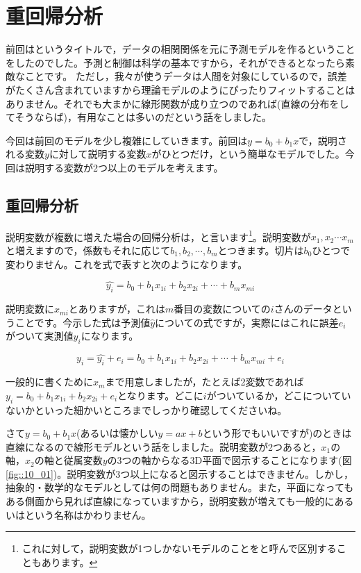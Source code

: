 \documentclass{ltjbook}
\begin{document}
\chapter{重回帰分析}
\label{m10_MultipleRegression}

前回はというタイトルで，データの相関関係を元に予測モデルを作るということをしたのでした。予測と制御は科学の基本ですから，それができるとなったら素敵なことです。
ただし，我々が使うデータは人間を対象にしているので，誤差がたくさん含まれていますから理論モデルのようにぴったりフィットすることはありません。それでも大まかに線形関数が成り立つのであれば(直線の分布をしてそうならば)，有用なことは多いのだという話をしました。

今回は前回のモデルを少し複雑にしていきます。前回は$y=b_0+b_1x$で，説明される変数$y$に対して説明する変数$x$がひとつだけ，という簡単なモデルでした。今回は説明する変数が2つ以上のモデルを考えます。

\section{重回帰分析}
説明変数が複数に増えた場合の回帰分析は，と言います\footnote{これに対して，説明変数が1つしかないモデルのことをと呼んで区別することもあります。}。説明変数が$x_1,x_2\cdots x_m$と増えますので，係数もそれに応じて$b_1,b_2,\cdots,b_m$とつきます。切片は$b_0$ひとつで変わりません。これを式で表すと次のようになります。

\[\hat{y_i}=b_0 + b_1x_{1i}+b_2x_{2i}+\cdots+b_mx_{mi}\]

説明変数に$x_{mi}$とありますが，これは$m$番目の変数についての$i$さんのデータということです。今示した式は予測値$\hat{y}$についての式ですが，実際にはこれに誤差$e_i$がついて実測値$y_i$になります。

\[ y_i = \hat{y_i} + e_i = b_0 + b_1x_{1i}+b_2x_{2i}+\cdots+b_mx_{mi} + e_i \]

一般的に書くために$x_m$まで用意しましたが，たとえば2変数であれば$y_i = b_0 + b_1x_{1i}+b_2x_{2 i}+e_i$となります。どこに$i$がついているか，どこについていないかといった細かいところまでしっかり確認してくださいね。

さて$y=b_0 + b_1 x$(あるいは懐かしい$y=ax+b$という形でもいいですが)のときは直線になるので線形モデルという話をしました。説明変数が2つあると，$x_1$の軸，$x_2$の軸と従属変数$y$の3つの軸からなる3D平面で図示することになります(図\ref{fig::10_01})。説明変数が3つ以上になると図示することはできません。しかし，抽象的・数学的なモデルとしては何の問題もありません。また，平面になってもある側面から見れば直線になっていますから，説明変数が増えても一般的にあるいはという名称はかわりません。
\end{document}
